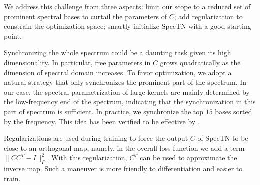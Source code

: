 We address this challenge from three aspects: limit our scope to a reduced set of prominent spectral bases to curtail the parameters of $C$; add regularization to constrain the optimization space; smartly initialize SpecTN with a good starting point.  


 Synchronizing the whole spectrum could be a daunting task given its high dimensionality. In particular, free parameters in $C$ grows quadratically as the dimension of spectral domain increases. To favor optimization, we adopt a natural strategy that only synchronizes the prominent part of the spectrum. In our case, the spectral parametrization of large kernels are mainly determined by the low-frequency end of the spectrum, indicating that the synchronization in this part of spectrum is sufficient. In practice, we synchronize the top $15$ bases sorted by the frequency. This idea has been verified to be effective by \cite{ovsjanikov2012functional}.



Regularizations are used during training to force the output $C$ of SpecTN to be close to an orthogonal map, namely, in the overall loss function we add a term $\|CC^T-I\|_F^2$. With this regularization, $C^T$ can be used to approximate the inverse map. Such a maneuver is more friendly to differentiation and easier to train. 


